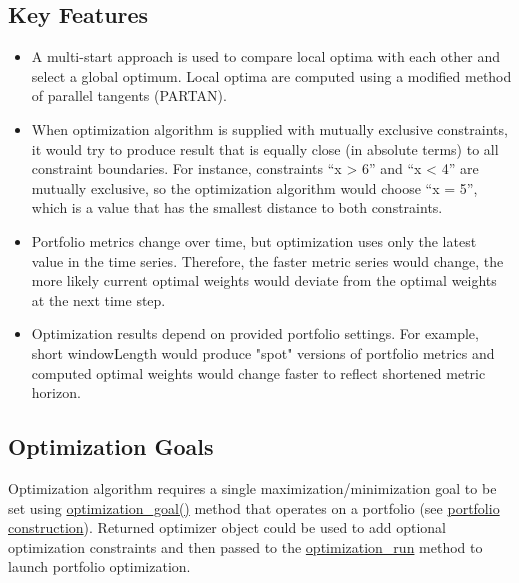 \documentclass[letterpaper]{report}
\newcounter{N}
\begin{document}
\subsection{Key Features}
\begin{itemize} 
  \item A multi-start approach is used to compare local optima with each other and select a global optimum. 
		Local optima are computed using a modified method of parallel tangents (PARTAN).
  \item When optimization algorithm is supplied with mutually exclusive constraints, it would try to produce result that is equally close (in absolute terms) to all constraint boundaries. 
		For instance, constraints ``x > 6'' and ``x < 4'' are mutually exclusive, so
		the optimization algorithm would choose ``x = 5'', which is a value that has the smallest distance to both constraints.
  \item Portfolio metrics change over time, but optimization uses only the latest value in the time series.
		Therefore, the faster metric series would change, the more likely current optimal weights would deviate
		from the optimal weights at the next time step. 
  \item Optimization results depend on provided portfolio settings. 
		For example, short windowLength would produce "spot" versions of portfolio metrics and 
		computed optimal weights would change faster to reflect shortened metric horizon. 
\end{itemize}

\subsection{Optimization Goals}
Optimization algorithm requires a single maximization/minimization goal to be set using 
\href{https://www.portfolioeffect.com/docs/platform/quant/functions/optimization-functions/optimization-goal}{optimization\_goal()}
method that operates on a portfolio (see
\href{https://www.portfolioeffect.com/docs/platform/quant/manuals/portfolio-construction}{portfolio
construction}).
Returned optimizer object could be used to add optional optimization constraints and then passed to the 
\href{https://www.portfolioeffect.com/docs/platform/quant/functions/optimization-functions/optimization-run}{optimization\_run}
method to launch portfolio optimization.
\par
\end{document}
